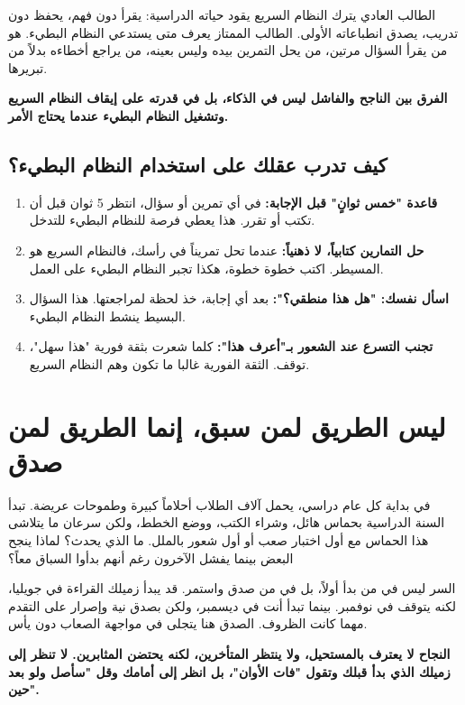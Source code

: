 \documentclass[12pt,a4paper]{book}
\newcommand{\importantAr}[1]{%
	\begin{important}
		\bfseries #1
	\end{important}
}
\begin{document}
	الطالب العادي يترك النظام السريع يقود حياته الدراسية: يقرأ دون فهم، يحفظ دون تدريب، يصدق انطباعاته الأولى. الطالب الممتاز يعرف متى يستدعي النظام البطيء. هو من يقرأ السؤال مرتين، من يحل التمرين بيده وليس بعينه، من يراجع أخطاءه بدلاً من تبريرها.
	
	\importantAr{الفرق بين الناجح والفاشل ليس في الذكاء، بل في قدرته على إيقاف النظام السريع وتشغيل النظام البطيء عندما يحتاج الأمر.}
	
	\subsection{كيف تدرب عقلك على استخدام النظام البطيء؟}
	
	\begin{enumerate}
		\item \textbf{قاعدة "خمس ثوانٍ" قبل الإجابة:} في أي تمرين أو سؤال، انتظر 5 ثوان قبل أن تكتب أو تقرر. هذا يعطي فرصة للنظام البطيء للتدخل.
		
		\item \textbf{حل التمارين كتابياً، لا ذهنياً:} عندما تحل تمريناً في رأسك، فالنظام السريع هو المسيطر. اكتب خطوة خطوة، هكذا تجبر النظام البطيء على العمل.
		
		\item \textbf{اسأل نفسك: "هل هذا منطقي؟":} بعد أي إجابة، خذ لحظة لمراجعتها. هذا السؤال البسيط ينشط النظام البطيء.
		
		\item \textbf{تجنب التسرع عند الشعور بـ"أعرف هذا":} كلما شعرت بثقة فورية "هذا سهل"، توقف. الثقة الفورية غالبا ما تكون وهم النظام السريع.
	\end{enumerate}
	
	\section{ليس الطريق لمن سبق، إنما الطريق لمن صدق}
	
	في بداية كل عام دراسي، يحمل آلاف الطلاب أحلاماً كبيرة وطموحات عريضة. تبدأ السنة الدراسية بحماس هائل، وشراء الكتب، ووضع الخطط، ولكن سرعان ما يتلاشى هذا الحماس مع أول اختبار صعب أو أول شعور بالملل. ما الذي يحدث؟ لماذا ينجح البعض بينما يفشل الآخرون رغم أنهم بدأوا السباق معاً؟
	
	السر ليس في من بدأ أولاً، بل في من صدق واستمر. قد يبدأ زميلك القراءة في جويليا، لكنه يتوقف في نوفمبر. بينما تبدأ أنت في ديسمبر، ولكن بصدق نية وإصرار على التقدم مهما كانت الظروف. الصدق هنا يتجلى في مواجهة الصعاب دون يأس.
	
	
	\importantAr{النجاح لا يعترف بالمستحيل، ولا ينتظر المتأخرين، لكنه يحتضن المثابرين. لا تنظر إلى زميلك الذي بدأ قبلك وتقول "فات الأوان"، بل انظر إلى أمامك وقل "سأصل ولو بعد حين".}
	
\end{document}
